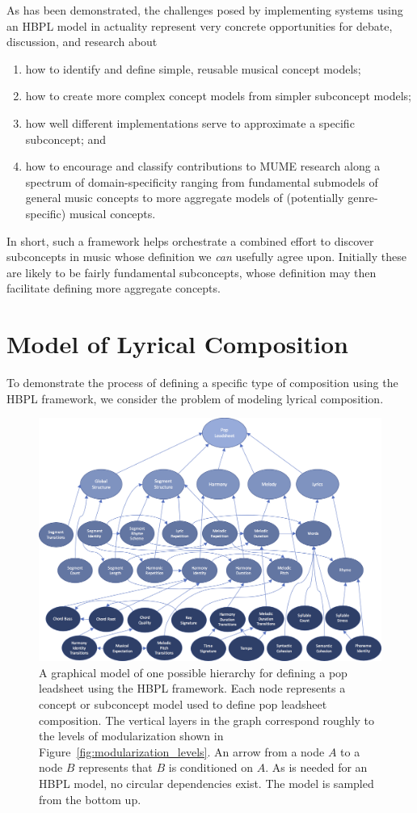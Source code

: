 \documentclass[letterpaper]{article}
\begin{document}
As has been demonstrated, the challenges posed by implementing systems using an HBPL model in actuality represent very concrete opportunities for debate, discussion, and research about
\begin{enumerate}
\item how to identify and define simple, reusable musical concept models;
\item how to create more complex concept models from simpler subconcept models;
\item how well different implementations serve to approximate a specific subconcept; and
\item how to encourage and classify contributions to MUME research along a spectrum of domain-specificity ranging from fundamental submodels of general music concepts to more aggregate models of (potentially genre-specific) musical concepts.
\end{enumerate}
\noindent In short, such a framework helps orchestrate a combined effort to discover subconcepts in music whose definition we \emph{can} usefully agree upon. Initially these are likely to be fairly fundamental subconcepts, whose definition may then facilitate defining more aggregate concepts.

\section{Model of Lyrical Composition}

To demonstrate the process of defining a specific type of composition using the HBPL framework, we consider the problem of modeling lyrical composition.

\begin{figure}[th]
	\centering
	\includegraphics[width=\linewidth]{pop_hbpl_gradient}
	\caption{\label{fig:pop_hbpl_gradient} A graphical model of one possible hierarchy for defining a pop leadsheet using the HBPL framework. Each node represents a concept or subconcept model used to define pop leadsheet composition. The vertical layers in the graph correspond roughly to the levels of modularization shown in Figure~\ref{fig:modularization_levels}. An arrow from a node $A$ to a node $B$ represents that $B$ is conditioned on $A$. As is needed for an HBPL model, no circular dependencies exist. The model is sampled from the bottom up.}
\end{figure}
\end{document}
